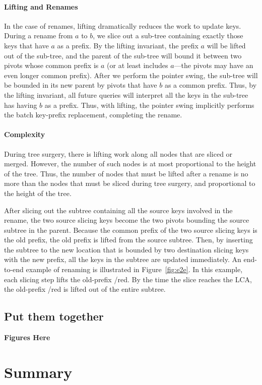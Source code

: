 \paragraph{Lifting and Renames}
In the case of renames, lifting dramatically reduces the work to update
keys.  During a rename from $a$ to $b$, we slice out a sub-tree
containing exactly those keys that have $a$ as a prefix.  By the
lifting invariant, the prefix $a$ will be lifted out of the sub-tree,
and the parent of the sub-tree will bound it between two pivots whose
common prefix is $a$ (or at least includes $a$---the pivots may have
an even longer common prefix).  After we perform the pointer swing,
the sub-tree will be bounded in its new parent by pivots that have $b$
as a common prefix.  Thus, by the lifting invariant, all future queries
will interpret all the keys in the sub-tree has having $b$ as a prefix.
Thus, with lifting, the pointer swing implicitly performs the batch key-prefix
replacement, completing the rename.

\paragraph{Complexity} During tree surgery, there is lifting work
along all nodes that are sliced or merged.  However, the number of
such nodes is at most proportional to the height of the tree.
Thus, the number of nodes that must be lifted after a rename is no more than
the nodes that must be sliced during tree surgery, and proportional to the height
of the tree.

After slicing out the subtree containing all the source keys involved in the rename,
the two source slicing keys become the two pivots bounding the source subtree in the
parent.
Because the common prefix of the two source slicing keys is the old prefix,
the old prefix is lifted from the source subtree.
Then, by inserting the subtree
to the new location that is bounded by two destination slicing keys with the new prefix,
all the keys in the subtree are updated immediately.
An end-to-end example of renaming is illustrated in Figure~\ref{fig:e2e}.
In this example, each slicing step lifts the old-prefix /red. By the time the slice reaches the LCA,
the old-prefix /red is lifted out of the entire subtree.

\subsection{Put them together}

\textbf{Figures Here}

\section{Summary}

